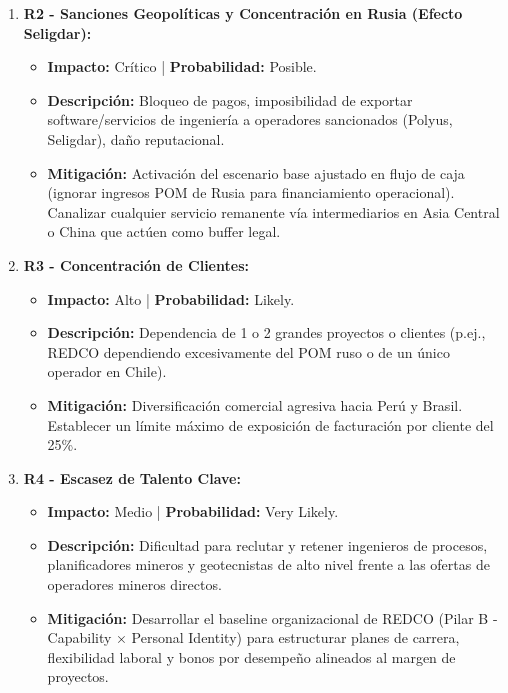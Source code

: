 \begin{enumerate}
    \item \textbf{R2 - Sanciones Geopolíticas y Concentración en Rusia (Efecto Seligdar):}
    \begin{itemize}
        \item \textbf{Impacto:} Crítico | \textbf{Probabilidad:} Posible.
        \item \textbf{Descripción:} Bloqueo de pagos, imposibilidad de exportar software/servicios de ingeniería a operadores sancionados (Polyus, Seligdar), daño reputacional.
        \item \textbf{Mitigación:} Activación del escenario base ajustado en flujo de caja (ignorar ingresos POM de Rusia para financiamiento operacional). Canalizar cualquier servicio remanente vía intermediarios en Asia Central o China que actúen como buffer legal.
    \end{itemize}

    \item \textbf{R3 - Concentración de Clientes:}
    \begin{itemize}
        \item \textbf{Impacto:} Alto | \textbf{Probabilidad:} Likely.
        \item \textbf{Descripción:} Dependencia de 1 o 2 grandes proyectos o clientes (p.ej., REDCO dependiendo excesivamente del POM ruso o de un único operador en Chile).
        \item \textbf{Mitigación:} Diversificación comercial agresiva hacia Perú y Brasil. Establecer un límite máximo de exposición de facturación por cliente del 25\%.
    \end{itemize}

    \item \textbf{R4 - Escasez de Talento Clave:}
    \begin{itemize}
        \item \textbf{Impacto:} Medio | \textbf{Probabilidad:} Very Likely.
        \item \textbf{Descripción:} Dificultad para reclutar y retener ingenieros de procesos, planificadores mineros y geotecnistas de alto nivel frente a las ofertas de operadores mineros directos.
        \item \textbf{Mitigación:} Desarrollar el baseline organizacional de REDCO (Pilar B - Capability × Personal Identity) para estructurar planes de carrera, flexibilidad laboral y bonos por desempeño alineados al margen de proyectos.
    \end{itemize}


\end{enumerate}
